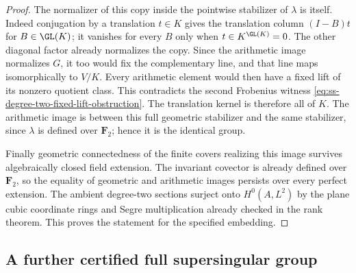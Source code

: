 \begin{proof}
The normalizer of this copy inside the pointwise stabilizer of $\lambda$
is itself. Indeed conjugation by a translation $t\in K$ gives the
translation column $(I-B)t$ for $B\in\GL(K)$; it vanishes for every $B$
only when $t\in K^{\GL(K)}=0$. The other diagonal factor already
normalizes the copy. Since the arithmetic image normalizes $G$, it too
would fix the complementary line, and that line maps isomorphically to
$V/K$. Every arithmetic element would then have a fixed lift of its
nonzero quotient class. This contradicts the second Frobenius witness
\eqref{eq:ss-degree-two-fixed-lift-obstruction}.
The translation kernel is therefore all of $K$.
The arithmetic image is between this full geometric stabilizer and the
same stabilizer, since $\lambda$ is defined over $\mathbf F_2$; hence it
is the identical group.

Finally geometric connectedness of the finite covers realizing this
image survives algebraically closed field extension. The invariant
covector is already defined over $\mathbf F_2$, so the equality of
geometric and arithmetic images persists over every perfect extension.
The ambient degree-two sections surject onto $H^0(A,L^2)$ by the plane
cubic coordinate rings and Segre multiplication already checked in the
rank theorem. This proves the statement for the specified embedding.
\end{proof}


\subsection{A further certified full supersingular group}
\label{subsec:ss-product-degree-three-full}

